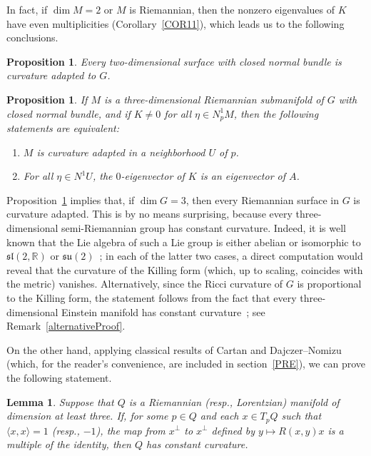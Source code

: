 \documentclass[a4paper,12pt,oneside]{amsart}
\theoremstyle{plain}
\newtheorem{proposition}[theorem]{Proposition}
\newtheorem{lemma}[theorem]{Lemma}
\theoremstyle{remark}
\theoremstyle{definition}
\begin{document}
In fact, if $\dim M = 2$ or $M$ is Riemannian, then the nonzero eigenvalues of $K$ have even multiplicities (Corollary~\ref{COR11}), which leads us to the following conclusions.
\begin{proposition}\label{PROP4.0}
Every two-dimensional surface with closed normal bundle is curvature adapted to $G$.
\end{proposition}

\begin{proposition}\label{PROP4}
If $M$ is a three-dimensional Riemannian submanifold of $G$ with closed normal bundle, and if $K \neq 0$ for all $\eta \in N^{1}_{p}M$, then the following statements are equivalent:
\begin{enumerate}[font=\upshape, label=(\roman*)]
\item $M$ is curvature adapted in a neighborhood $U$ of $p$.
\item For all $\eta \in N^{1}U$, the $0$-eigenvector of $K$ is an eigenvector of $A$.
\end{enumerate}
\end{proposition}

Proposition~\ref{PROP4.0} implies that, if $\dim G =3$, then every Riemannian surface in $G$ is curvature adapted.  This is by no means surprising, because every three-dimensional semi-Riemannian group has constant curvature. Indeed, it is well known that the Lie algebra of such a Lie group is either abelian or isomorphic to $\mathfrak{sl}(2,\mathbb{R})$ or $\mathfrak{su}(2)$~\cite{ovando2016}; in each of the latter two cases, a direct computation would reveal that the curvature of the Killing form (which, up to scaling, coincides with the metric) vanishes. Alternatively, since the Ricci curvature of $G$ is proportional to the Killing form, the statement follows from the fact that every three-dimensional Einstein manifold has constant curvature~\cite[p.~49]{besse2008}; see Remark~\ref{alternativeProof}.

On the other hand, applying classical results of Cartan and Dajczer--Nomizu (which, for the reader's convenience, are included in section~\ref{PRE}), we can prove the following statement.

%
\begin{lemma}
 Suppose that $Q$ is a Riemannian \textup{(}resp., Lorentzian\textup{)} manifold of dimension at least three. If, for some $p\in Q$ and each $x \in T_{p}Q$ such that $\langle x, x \rangle=1$ \textup{(}resp., $-1$\textup{)}, the map from $x^{\perp}$ to $x^{\perp}$ defined by $y \mapsto R(x,y)x$ is a multiple of the identity, then $Q$ has constant curvature.
 \end{lemma}
\end{document}

